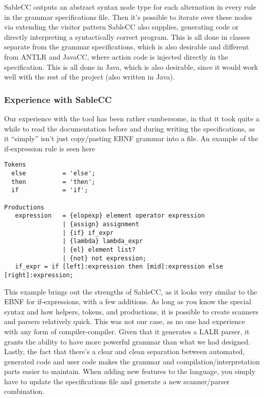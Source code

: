 SableCC outputs an abstract syntax node type for each alternation in every rule in the grammar specifications file. Then it's possible to iterate over these nodes via extending the visitor pattern SableCC also supplies, generating code or directly interpreting a syntactically correct program. This is all done in classes separate from the grammar specifications, which is also desirable and different from ANTLR and JavaCC, where action code is injected directly in the specification. This is all done in Java, which is also desirable, since it would work well with the rest of the project (also written in Java).

\subsubsection{Experience with SableCC}
Our experience with the tool has been rather cumbersome, in that it took quite a while to read the documentation before and during writing the specifications, as it ``simply'' isn't just copy/pasting EBNF grammar into a file. An example of the if-expression rule is seen here

\begin{lstlisting}[caption=Part of the grammar specifications file of SableCC with focus on if-expressions.]
Tokens
  else          = 'else';
  then          = 'then';
  if            = 'if';

Productions
   expression   = {elopexp} element operator expression
                | {assign} assignment
                | {if} if_expr
                | {lambda} lambda_expr
                | {el} element list?
                | {not} not expression;
   if_expr = if [left]:expression then [mid]:expression else [right]:expression;
\end{lstlisting}

This example brings out the strengths of SableCC, as it looks very
similar to the EBNF for if-expressions, with a few additions. As
long as you know the special syntax and how helpers, tokens, and
productions, it is possible to create scanners and parsers relatively
quick. This was not our case, as no one had experience with any form
of compiler-compiler. Given that it generates a LALR parser, it
grants the ability to have more powerful grammar than what we had
designed. Lastly, the fact that there's a clear and clean separation
between automated, generated code and user code makes the grammar and
compilation/interpretation parts easier to maintain. When adding new
features to the language, you simply have to update the specifications
file and generate a new scanner/parser combination.

